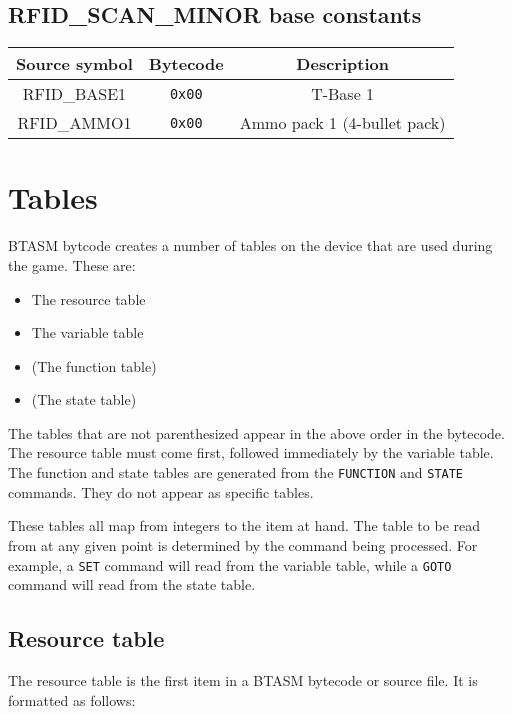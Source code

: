 \documentclass[12pt,a4paper]{scrbook}
\begin{document}
\subsection{RFID\_SCAN\_MINOR base constants}
\label{sec:rfidconstants}
\begin{minipage}{\linewidth}
\renewcommand{\thefootnote}{\thempfootnote}
\begin{center}
  \begin{tabular}{ | c | c || c | }
    \hline
    Source symbol & Bytecode	 & Description \\ \hline \hline
   	RFID\_BASE1 		& \texttt{0x00} & T-Base 1 \\ \hline
   	RFID\_AMMO1 		& \texttt{0x00} & Ammo pack 1 (4-bullet pack) \\ \hline
  \end{tabular}
\end{center}
\end{minipage}

\section{Tables}
BTASM bytcode creates a number of tables on the device that are used during the game.  These are:
\begin{itemize}
\item The resource table
\item The variable table
\item (The function table)
\item (The state table)
\end{itemize}

The tables that are not parenthesized appear in the above order in the bytecode.  
The resource table must come first, followed immediately by the variable table.  The function
and state tables are generated from the \texttt{FUNCTION} and \texttt{STATE} commands.  They do
not appear as specific tables.

These tables all map from integers to the item at hand.  The table to be read from
at any given point is determined by the command being processed.  For example, a 
\texttt{SET}
command will read from the variable table, while a \texttt{GOTO} command will read from the
state table.

\subsection{Resource table}
\label{sec:resourcetable}
The resource table is the first item in a BTASM bytecode or source file.  It is formatted as 
follows:
\end{document}

